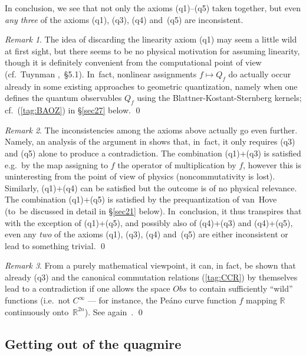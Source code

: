 \documentclass[12pt]{amsart}
\numberwithin{equation}{section}
\theoremstyle{remark}
\newtheorem{remark*}{Remark}
\newcommand\Obs{Obs}
\newcommand\RR{\mathbb R}
\begin{document}
In conclusion, we  see that not only the axioms (q1)--(q5) taken together,
but even {\it {any} {three}} of the axioms (q1), (q3), (q4)
and~(q5) are inconsistent.

\begin{remark*} The idea of discarding the linearity axiom (q1) may seem a
little wild at first sight, but there seems to be no physical motivation for
assuming linearity, though it is definitely convenient from the computational
point of view (cf.~Tuynman \cite{bib:TuyWis},~\S5.1). In~fact, nonlinear
assignments $f\mapsto Q_f$ do actually occur already in some existing
approaches to geometric quantization, namely when one defines the quantum
observables $Q_f$ using the Blattner-Kostant-Sternberg kernels;
cf.~(\ref{tag:BAOZ}) in \S\ref{sec27} below.   \qed  \end{remark*}

\begin{remark*} The inconsistencies among the axioms above actually go even
further. Namely, an analysis of the argument in \cite{bib:ETuy} shows that,
in~fact, it only requires (q3) and (q5) alone to produce a contradiction. The
combination (q1)+(q3) is satisfied e.g.~by the map assigning to $f$ the
operator of multiplication by $f$, however this is uninteresting from the point
of view of physics (noncommutativity is lost). Similarly, (q1)+(q4) can be
satisfied but the outcome is of no physical relevance. The combination
(q1)+(q5) is satisfied by the prequantization of van~Hove (to~be discussed in
detail in \S\ref{sec21} below). In~conclusion, it thus transpires that with the
exception of (q1)+(q5), and possibly also of (q4)+(q3) and (q4)+(q5), even
any {\it two} of the axioms (q1), (q3), (q4) and~(q5) are either
inconsistent or lead to something trivial.   \qed  \end{remark*}

\begin{remark*} From a purely mathematical viewpoint, it can, in fact, be shown
that already (q3) and the canonical commutation relations (\ref{tag:CCR}) by
themselves lead to a contradiction if one allows the space $\Obs$ to contain
sufficiently ``wild'' functions (i.e.~not $C^\infty$ --- for instance, the
Pe\'ano curve function $f$ mapping $\RR$ continuously onto~$\RR^{2n}$).
See again~\cite{bib:ETuy}.   \qed  \end{remark*}

\subsection{Getting out of the quagmire}
\end{document}
